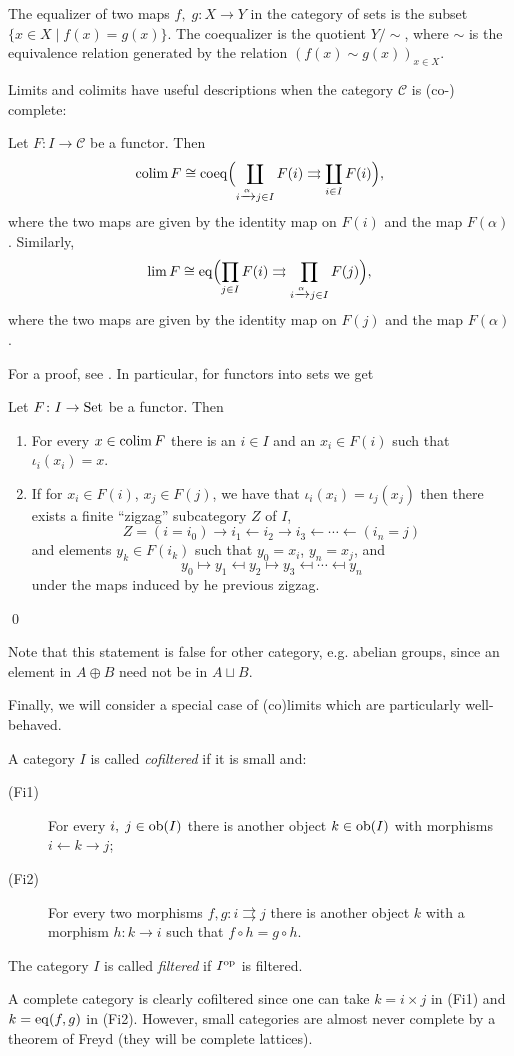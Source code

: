 \documentclass[a4paper,openany]{scrbook}
\renewcommand{\C}{\mathcal C}
\begin{document}
The equalizer of two maps $f,\;g \colon X \to Y$ in the category of sets is the subset $\{x \in X \mid f(x)=g(x)\}$. The coequalizer is the quotient $Y/\sim$, where $\sim$ is the equivalence relation generated by the relation $(f(x) \sim g(x))_{x \in X}$.

Limits and colimits have useful descriptions when the category $\C$ is (co-) complete:
\begin{lemma}
Let $F\colon I \to \C$ be a functor. Then
\[
\operatorname*{colim} F \cong \operatorname{coeq}\Bigl(\coprod_{i \xrightarrow{\alpha} j \in I} F(i) \rightrightarrows \coprod_{i \in I} F(i)\Bigr),
\]
where the two maps are given by the identity map on $F(i)$ and the map $F(\alpha)$. Similarly,
\[
\lim F \cong \operatorname{eq}\Bigl(\prod_{j \in I} F(i) \rightrightarrows \prod_{i \xrightarrow{\alpha} j \in I} F(j)\Bigr),
\]
where the two maps are given by the identity map on $F(j)$ and the map $F(\alpha)$.
\end{lemma}

For a proof, see \cite[Theorem~V.2.2]{maclane:cwm}. In particular, for functors into sets we get
\begin{lemma}\label{lem:setvaluedlim}
Let $F\colon I \to \operatorname{Set}$ be a functor. Then
\begin{enumerate}
\item For every $x \in \operatorname*{colim} F$ there is an $i \in I$ and an $x_i \in F(i)$ such that $\iota_i(x_i) = x$.\label{lem:setvaluedlim:colim}
\item If for $x_i \in F(i)$, $x_j \in F(j)$, we have that $\iota_i(x_i) = \iota_j(x_j)$ then there exists a finite ``zigzag'' subcategory $Z$ of $I$,
\[
Z = (i=i_0) \to i_1 \leftarrow i_2 \to i_3 \leftarrow \cdots \leftarrow (i_n=j)
\]
and elements $y_k \in F(i_k)$ such that $y_0=x_i$, $y_n=x_j$, and 
\[
y_0 \mapsto y_1 \mapsfrom y_2 \mapsto y_3 \mapsfrom \cdots \mapsfrom y_n
\]
under the maps induced by he previous zigzag. \label{lema:setvaluedlim:colimequivalence}
\end{enumerate}\qed
\end{lemma}

Note that this statement is false for other category, e.g. abelian groups, since an element in $A \oplus B$ need not be in $A \sqcup B$.

Finally, we will consider a special case of (co)limits which are particularly well-behaved.
\begin{defn}
A category $I$ is called \emph{cofiltered} if it is small and:
\begin{description}
\item[(Fi1)] For every $i,\;j \in \operatorname{ob}(I)$ there is another object $k \in \operatorname{ob}(I)$ with morphisms $i \leftarrow k \to j$;
\item[(Fi2)] For every two morphisms $f,g\colon i \rightrightarrows j$ there is another object $k$ with a morphism $h\colon k \to i$ such that $f \circ h = g \circ h$.
\end{description}
The category $I$ is called \emph{filtered} if $I^{\operatorname{op}}$ is filtered.
\end{defn}
A complete category is clearly cofiltered since one can take $k = i \times j$ in (Fi1) and $k = \operatorname{eq}(f,g)$ in (Fi2). However, small categories are almost never complete by a theorem of Freyd (they will be complete lattices).
\end{document}
